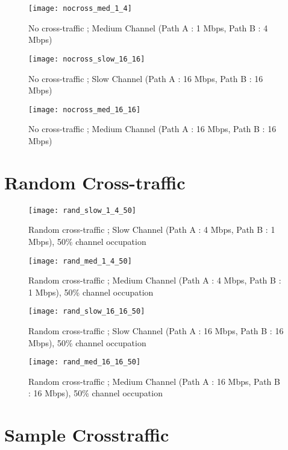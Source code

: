 \begin{figure}[!ht]
\caption{No cross-traffic ; Medium Channel (Path A : 1 Mbps, Path B : 4 Mbps)}
\centering
\texttt{[image: nocross\_med\_1\_4]}
\end{figure}



\begin{figure}[!ht]
\caption{No cross-traffic ; Slow Channel (Path A : 16 Mbps, Path B : 16 Mbps)}
\centering
\texttt{[image: nocross\_slow\_16\_16]}
\end{figure}

\begin{figure}[!ht]
\caption{No cross-traffic ; Medium Channel (Path A : 16 Mbps, Path B : 16 Mbps)}
\centering
\texttt{[image: nocross\_med\_16\_16]}
\end{figure}


\section{Random Cross-traffic}

\begin{figure}[!ht]
\caption{Random cross-traffic ; Slow Channel (Path A : 4 Mbps, Path B : 1 Mbps), 50\% channel occupation}
\centering
\texttt{[image: rand\_slow\_1\_4\_50]}
\end{figure}

\begin{figure}[!ht]
\caption{Random cross-traffic ; Medium Channel (Path A : 4 Mbps, Path B : 1 Mbps), 50\% channel occupation}
\centering
\texttt{[image: rand\_med\_1\_4\_50]}
\end{figure}

\begin{figure}[!ht]
\caption{Random cross-traffic ; Slow Channel (Path A : 16 Mbps, Path B : 16 Mbps), 50\% channel occupation}
\centering
\texttt{[image: rand\_slow\_16\_16\_50]}
\end{figure}

\begin{figure}[!ht]
\caption{Random cross-traffic ; Medium Channel (Path A : 16 Mbps, Path B : 16 Mbps), 50\% channel occupation}
\centering
\texttt{[image: rand\_med\_16\_16\_50]}
\end{figure}

\section{Sample Crosstraffic}

